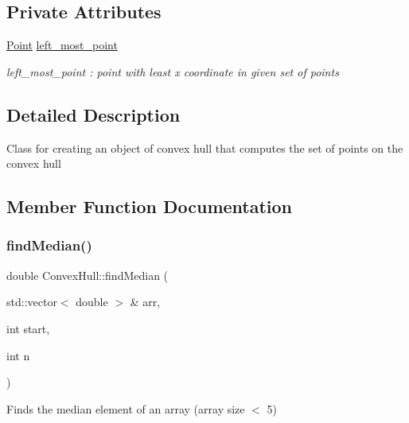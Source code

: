 \subsection*{Private Attributes}
\begin{DoxyCompactItemize}
\item 
\mbox{\label{classConvexHull_a06328b644694f8e75273311c37f22a5e}} 
\hyperlink{classPoint}{Point} \hyperlink{classConvexHull_a06328b644694f8e75273311c37f22a5e}{left\+\_\+most\+\_\+point}
\begin{DoxyCompactList}\small\item\em left\+\_\+most\+\_\+point \+: point with least x coordinate in given set of points \end{DoxyCompactList}\end{DoxyCompactItemize}


\subsection{Detailed Description}
Class for creating an object of convex hull that computes the set of points on the convex hull 

\subsection{Member Function Documentation}
\mbox{\label{classConvexHull_ae9a05f0c2c429d5cbac387848c5d838a}} 
\subsubsection{\texorpdfstring{find\+Median()}{findMedian()}}
{\footnotesize\ttfamily double Convex\+Hull\+::find\+Median (\begin{DoxyParamCaption}\item[{std\+::vector$<$ double $>$ \&}]{arr,  }\item[{int}]{start,  }\item[{int}]{n }\end{DoxyParamCaption})\hspace{0.3cm}{\ttfamily [private]}}

Finds the median element of an array (array size $<$ 5) \mbox{\label{classConvexHull_ac074c3d6e238d203baa62c0da7b5c7b2}} 
